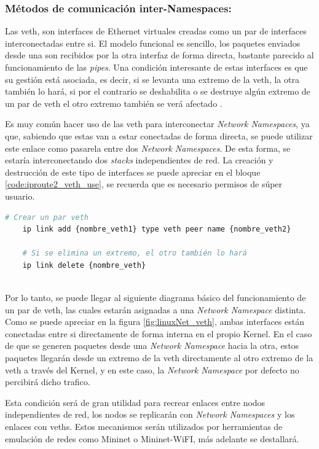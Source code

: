 \subsubsection{Métodos de comunicación inter-Namespaces: }
\label{linuxVeths}
Las \gls{veth}, son interfaces de Ethernet virtuales creadas como un par de interfaces interconectadas entre si. El modelo funcional es sencillo, los paquetes enviados desde una son recibidos por la otra interfaz de forma directa, bastante parecido al funcionamiento de las \textit{pipes}. Una condición interesante de estas interfaces es que su gestión está asociada, es decir, si se levanta una extremo de la \gls{veth}, la otra también lo hará, si por el contrario se deshabilita o se destruye algún extremo de un par de \gls{veth} el otro extremo también se verá afectado \cite{veth}.\\
\par
Es muy común hacer uso de las \gls{veth} para interconectar \textit{Network Namespaces}, ya que, sabiendo que estas van a estar conectadas de forma directa, se puede utilizar este enlace como pasarela entre dos \textit{Network Namespaces}. De esta forma, se estaría interconectando dos \textit{stacks} independientes de red. La creación y destrucción de este tipo de interfaces se puede apreciar en el bloque \ref{code:iproute2_veth_use}, se recuerda que es necesario permisos de súper usuario.\\

\begin{lstlisting}[language= bash, style=Consola, caption={Manejo de Veths},label=code:iproute2_veth_use]
    # Crear un par veth
    ip link add {nombre_veth1} type veth peer name {nombre_veth2}
    
    # Si se elimina un extremo, el otro también lo hará
    ip link delete {nombre_veth}
    
\end{lstlisting}
\vspace{0.5cm}

Por lo tanto, se puede llegar al siguiente diagrama básico del funcionamiento de un par de \gls{veth}, las cuales estarán asignadas a una \textit{Network Namespace} distinta.  Como se puede apreciar en la figura \ref{fig:linuxNet_veth}, ambas interfaces están conectadas entre si directamente de forma interna en el propio Kernel. En el caso de que se generen paquetes desde una \textit{Network Namespace} hacia la otra, estos paquetes llegarán desde un extremo de la \gls{veth} directamente al otro extremo de la \gls{veth} a través del Kernel, y en este caso, la \textit{Network Namespace} por defecto no percibirá dicho trafico.\\
\par
Esta condición será de gran utilidad para recrear enlaces entre nodos independientes de red, los nodos se replicarán con \textit{Network Namespaces} y los enlaces con \gls{veth}s. Estos mecanismos serán utilizados por herramientas de emulación de redes como Mininet o Mininet-WiFI, más adelante se destallará.

